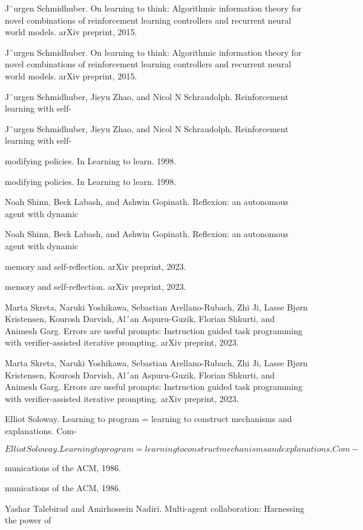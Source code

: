 \documentclass[12pt]{article}
\begin{document}
J¨urgen Schmidhuber. On learning to think: Algorithmic information theory for novel combinations
of reinforcement learning controllers and recurrent neural world models. arXiv preprint, 2015.


J¨urgen Schmidhuber. On learning to think: Algorithmic information theory for novel combinations
of reinforcement learning controllers and recurrent neural world models. arXiv preprint, 2015.


J¨urgen Schmidhuber, Jieyu Zhao, and Nicol N Schraudolph. Reinforcement learning with self-


J¨urgen Schmidhuber, Jieyu Zhao, and Nicol N Schraudolph. Reinforcement learning with self-


modifying policies. In Learning to learn. 1998.


modifying policies. In Learning to learn. 1998.


Noah Shinn, Beck Labash, and Ashwin Gopinath. Reflexion: an autonomous agent with dynamic


Noah Shinn, Beck Labash, and Ashwin Gopinath. Reflexion: an autonomous agent with dynamic


memory and self-reflection. arXiv preprint, 2023.


memory and self-reflection. arXiv preprint, 2023.


Marta Skreta, Naruki Yoshikawa, Sebastian Arellano-Rubach, Zhi Ji, Lasse Bjørn Kristensen,
Kourosh Darvish, Al´an Aspuru-Guzik, Florian Shkurti, and Animesh Garg. Errors are useful
prompts: Instruction guided task programming with verifier-assisted iterative prompting. arXiv
preprint, 2023.


Marta Skreta, Naruki Yoshikawa, Sebastian Arellano-Rubach, Zhi Ji, Lasse Bjørn Kristensen,
Kourosh Darvish, Al´an Aspuru-Guzik, Florian Shkurti, and Animesh Garg. Errors are useful
prompts: Instruction guided task programming with verifier-assisted iterative prompting. arXiv
preprint, 2023.


Elliot Soloway. Learning to program = learning to construct mechanisms and explanations. Com-


\begin{equation}
Elliot Soloway. Learning to program = learning to construct mechanisms and explanations. Com-
\end{equation}


munications of the ACM, 1986.


munications of the ACM, 1986.


Yashar Talebirad and Amirhossein Nadiri. Multi-agent collaboration: Harnessing the power of
\end{document}
